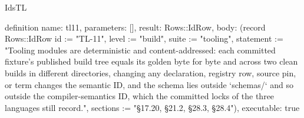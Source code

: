 \begin{lexlean}{IdsTL}
\begin{semanticmodule}
definition{
  name: tl11,
  parameters: [],
  result: Rows::IdRow,
  body: (record Rows::IdRow {id := "TL-11", level := "build", suite := "tooling", statement := "Tooling modules are deterministic and content-addressed: each committed fixture's published build tree equals its golden byte for byte and across two clean builds in different directories, changing any declaration, registry row, source pin, or term changes the semantic ID, and the schema lies outside `schemas/` and so outside the compiler-semantics ID, which the committed locks of the three languages still record.", sections := "§17.20, §21.2, §28.3, §28.4"}),
  executable: true
}
\end{semanticmodule}
\end{lexlean}
